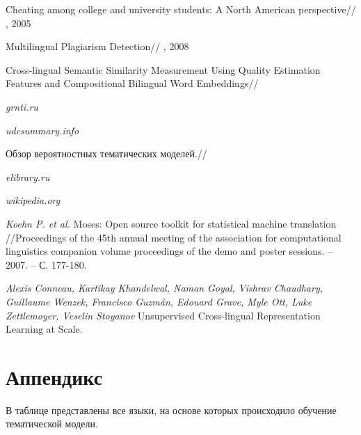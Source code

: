 \documentclass[12pt, twoside]{article}
\begin{document}
\begin{thebibliography}{8}

    Cheating among college and university students: A North American perspective//
    , 2005
    
    Multilingual Plagiarism Detection//
    , 2008
    
    Cross-lingual Semantic Similarity Measurement Using Quality Estimation Features and Compositional Bilingual Word Embeddings//
    

  \textit{grnti.ru}
  
  \textit{udcsummary.info}
    
    Обзор вероятностных тематических моделей.//
    
  \textit{elibrary.ru}   
  
  \textit{wikipedia.org}
  
  \textit{Koehn P. et al.} Moses: Open source toolkit for statistical machine translation //Proceedings of the 45th annual meeting of the association for computational linguistics companion volume proceedings of the demo and poster sessions. – 2007. – С. 177-180.

  \textit{Alexis Conneau, Kartikay Khandelwal, Naman Goyal, Vishrav Chaudhary, Guillaume Wenzek, Francisco Guzmán, Edouard Grave, Myle Ott, Luke Zettlemoyer, Veselin Stoyanov} Unsupervised Cross-lingual Representation Learning at Scale.
	  
\end{thebibliography}

\section{Аппендикс}
В таблице представлены все языки, на основе которых происходило обучение тематической модели.
\end{document}
